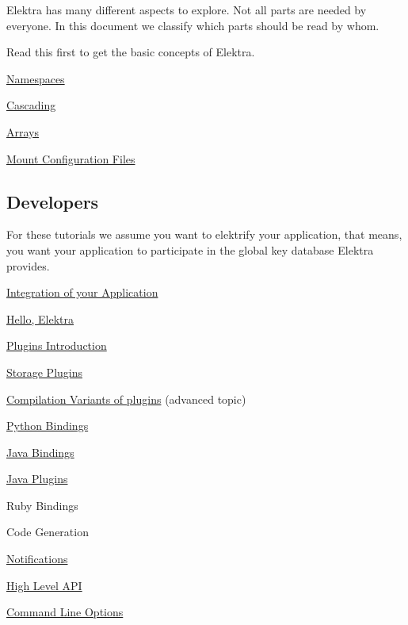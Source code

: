 Elektra has many different aspects to explore. Not all parts are needed by everyone. In this document we classify which parts should be read by whom.

Read this first to get the basic concepts of Elektra.


\begin{DoxyItemize}
\item \hyperlink{doc_tutorials_namespaces_md}{Namespaces}
\item \hyperlink{doc_tutorials_cascading_md}{Cascading}
\item \hyperlink{doc_tutorials_arrays_md}{Arrays}
\item \hyperlink{doc_tutorials_mount_md}{Mount Configuration Files}
\end{DoxyItemize}

\subsection*{Developers}

For these tutorials we assume you want to elektrify your application, that means, you want your application to participate in the global key database Elektra provides.


\begin{DoxyItemize}
\item \hyperlink{doc_tutorials_application-integration_md}{Integration of your Application}
\item \hyperlink{doc_tutorials_hello-elektra_md}{Hello, Elektra}
\item \hyperlink{doc_tutorials_plugins_md}{Plugins Introduction}
\item \hyperlink{doc_tutorials_storage-plugins_md}{Storage Plugins}
\item \hyperlink{doc_tutorials_compilation-variants_md}{Compilation Variants of plugins} (advanced topic)
\item \hyperlink{doc_tutorials_python-kdb_md}{Python Bindings}
\item \hyperlink{doc_tutorials_java-kdb_md}{Java Bindings}
\item \hyperlink{doc_tutorials_java-plugins_md}{Java Plugins}
\item Ruby Bindings
\item Code Generation
\item \hyperlink{doc_tutorials_notifications_md}{Notifications}
\item \hyperlink{src_libs_highlevel_README_md}{High Level A\+PI}
\item \hyperlink{doc_tutorials_command-line-options_md}{Command Line Options}
\end{DoxyItemize}

